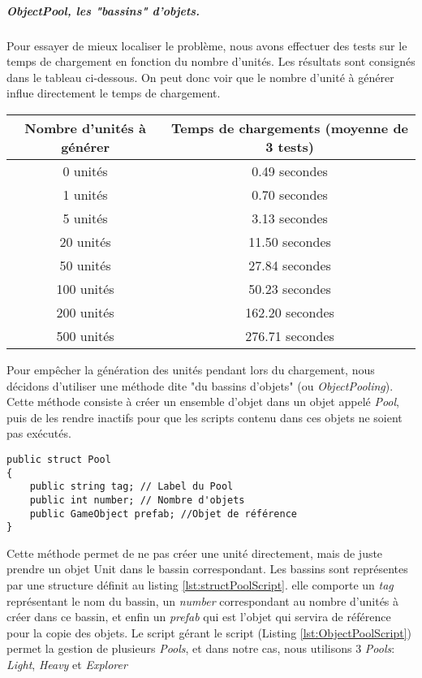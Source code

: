 \documentclass{report}
\begin{document}
\subparagraph{\textit{ObjectPool}, les "bassins" d'objets.}Pour essayer de mieux localiser le problème, nous avons effectuer des tests sur le temps de chargement en fonction du nombre d'unités. Les résultats sont consignés dans le tableau ci-dessous. On peut donc voir que le nombre d'unité à générer influe directement le temps de chargement.\newline
\begin{center}
\begin{tabular}{c|c}
  \hline
  Nombre d'unités à générer & Temps de chargements (moyenne de 3 tests) \\
  \hline
  0 unités & 0.49 secondes \\
  1 unités & 0.70 secondes \\
  5 unités & 3.13 secondes \\
  20 unités & 11.50 secondes \\
  50 unités & 27.84 secondes \\
  100 unités & 50.23 secondes \\
  200 unités & 162.20 secondes \\
  500 unités & 276.71 secondes \\
  \hline
\end{tabular}
\end{center}
Pour empêcher la génération des unités pendant lors du chargement, nous décidons d'utiliser une méthode dite "du bassins d'objets" (ou \textit{ObjectPooling}). Cette méthode consiste à créer un ensemble d'objet dans un objet appelé \textit{Pool}, puis de les rendre inactifs pour que les scripts contenu dans ces objets ne soient pas exécutés.

 \begin{lstlisting}[language={[Sharp]C},label={lst:structPoolScript}, caption= Code de la structure \textit{Pool} de ObjectPool.cs]
public struct Pool
{
    public string tag; // Label du Pool
    public int number; // Nombre d'objets
    public GameObject prefab; //Objet de référence
}
\end{lstlisting}

Cette méthode permet de ne pas créer une unité directement, mais de juste prendre un objet Unit dans le bassin correspondant. Les bassins sont représentes par une structure définit au listing \ref{lst:structPoolScript}. elle comporte un \textit{tag} représentant le nom du bassin, un  \textit{number} correspondant au nombre d'unités à créer dans ce bassin, et enfin un \textit{prefab} qui est l'objet qui servira de référence pour la copie des objets. Le script gérant le script (Listing  \ref{lst:ObjectPoolScript}) permet la gestion de plusieurs \textit{Pools}, et dans notre cas, nous utilisons 3 \textit{Pools}:  \textit{Light},  \textit{Heavy} et  \textit{Explorer}
\end{document}
